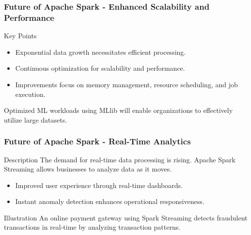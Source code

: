\documentclass[aspectratio=169]{beamer}
\begin{document}
\begin{frame}[fragile]
  \frametitle{Future of Apache Spark - Enhanced Scalability and Performance}
  \begin{block}{Key Points}
    \begin{itemize}
      \item Exponential data growth necessitates efficient processing.
      \item Continuous optimization for scalability and performance.
      \item Improvements focus on memory management, resource scheduling, and job execution.
    \end{itemize}
  \end{block}
  Optimized ML workloads using MLlib will enable organizations to effectively utilize large datasets.
\end{frame}

\begin{frame}[fragile]
  \frametitle{Future of Apache Spark - Real-Time Analytics}
  \begin{block}{Description}
    The demand for real-time data processing is rising. Apache Spark Streaming allows businesses to analyze data as it moves.
  \end{block}
  \begin{itemize}
    \item Improved user experience through real-time dashboards.
    \item Instant anomaly detection enhances operational responsiveness.
  \end{itemize}
  \begin{block}{Illustration}
    An online payment gateway using Spark Streaming detects fraudulent transactions in real-time by analyzing transaction patterns.
  \end{block}
\end{frame}
\end{document}
